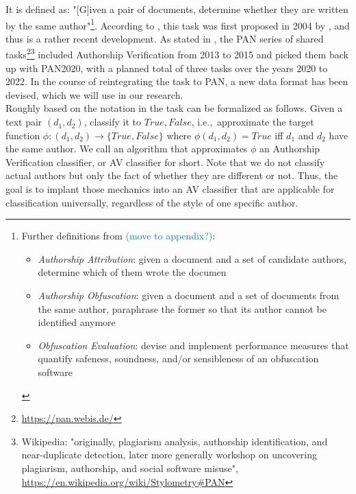 It is defined as: "[G]iven a pair of documents, determine whether they are written by the same author"\footnote{
Further definitions from \cite{bevendorff2020shared} \textcolor{teal}{(move to appendix?)}:
\begin{itemize}
  \item \textit{Authorship Attribution}: given a document and a set of candidate authors, determine which of them wrote  the  documen
  \item \textit{Authorship Obfuscation}: given a document and a set of documents from the same author, paraphrase the former so that its author cannot be identified anymore
  \item \textit{Obfuscation Evaluation}: devise and implement performance measures that quantify safeness, soundness, and/or sensibleness of an obfuscation software
\end{itemize}
}.
According to \cite{stein2019unbiasedGutenbergCorpus}, this task was first proposed in 2004 by \cite{koppel2004unmasking}, and thus is a rather recent development.
As stated in \cite{bevendorff2020shared}, the PAN series of shared tasks\footnote{\url{https://pan.webis.de/}}\footnote{Wikipedia: "originally, plagiarism analysis, authorship identification, and near-duplicate detection, later more generally workshop on uncovering plagiarism, authorship, and social software misuse", \url{https://en.wikipedia.org/wiki/Stylometry\#PAN}} included Authorship Verification from 2013 to 2015 and picked them back up with PAN2020, with a planned total of three tasks over the years 2020 to 2022.
In the course of reintegrating the task to PAN, a new data format has been devised, which we will use in our research.\\
Roughly based on the notation in \cite{bevendorff2020shared} the task can be formalized as follows.
Given a text pair $(d_1, d_2)$, classify it to ${True, False}$, i.e.,\ approximate the target function $\phi{}:(d_1, d_2)\to\{True, False\}$ where $\phi(d_1, d_2)=True$ iff $d_1$ and $d_2$ have the same author.
We call an algorithm that approximates $\phi$ an Authorship Verification classifier, or AV classifier for short.
Note that we do not classify actual authors but only the fact of whether they are different or not.
Thus, the goal is to implant those mechanics into an AV classifier that are applicable for classification universally, regardless of the style of one specific author.


